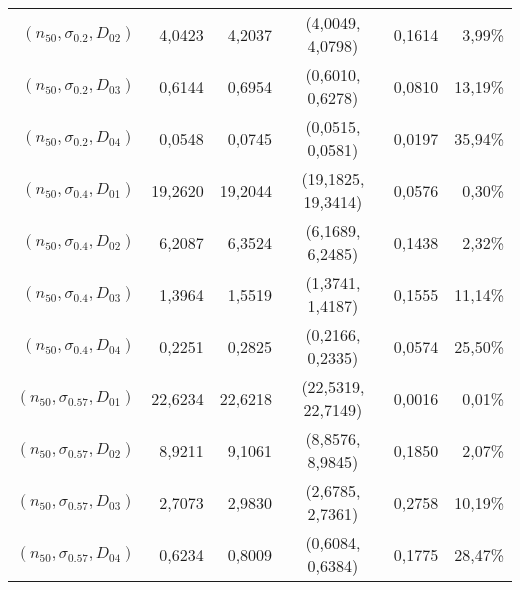 \documentclass[preprint,12pt]{elsarticle}
\begin{document}
\begin{table}[htbp]
\begin{tabular}{rrrcrr}
$(n_{50},\sigma_{0.2},D_{02})$ & 4,0423 & 4,2037 & (4,0049, 4,0798) & 0,1614 & 3,99\% \\
$(n_{50},\sigma_{0.2},D_{03})$ & 0,6144 & 0,6954 & (0,6010, 0,6278) & 0,0810 & 13,19\% \\
$(n_{50},\sigma_{0.2},D_{04})$ & 0,0548 & 0,0745 & (0,0515, 0,0581) & 0,0197 & 35,94\% \\
$(n_{50},\sigma_{0.4},D_{01})$ & 19,2620 & 19,2044 & (19,1825, 19,3414) & 0,0576 & 0,30\% \\
$(n_{50},\sigma_{0.4},D_{02})$ & 6,2087 & 6,3524 & (6,1689, 6,2485) & 0,1438 & 2,32\% \\
$(n_{50},\sigma_{0.4},D_{03})$ & 1,3964 & 1,5519 & (1,3741, 1,4187) & 0,1555 & 11,14\% \\
$(n_{50},\sigma_{0.4},D_{04})$ & 0,2251 & 0,2825 & (0,2166, 0,2335) & 0,0574 & 25,50\% \\
$(n_{50},\sigma_{0.57},D_{01})$ & 22,6234 & 22,6218 & (22,5319, 22,7149) & 0,0016 & 0,01\% \\
$(n_{50},\sigma_{0.57},D_{02})$  & 8,9211 & 9,1061 & (8,8576, 8,9845) & 0,1850 & 2,07\% \\
$(n_{50},\sigma_{0.57},D_{03})$  & 2,7073 & 2,9830 & (2,6785, 2,7361) & 0,2758 & 10,19\% \\
$(n_{50},\sigma_{0.57},D_{04})$  & 0,6234 & 0,8009 & (0,6084, 0,6384) & 0,1775 & 28,47\% \\
    \bottomrule
    \end{tabular}%
  \label{tab:addlabel}%
\end{table}%
\end{document}
